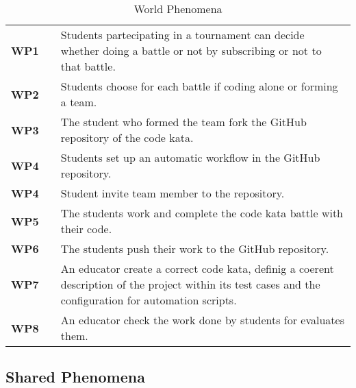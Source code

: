 \begin{table}[H]
    \centering
    \renewcommand{\arraystretch}{1.5}
    \begin{tabular}{l l p{12cm}}
        \hline
        \textbf{WP1} &  & Students partecipating in a tournament can decide whether doing a battle or not by subscribing or not to that battle.                                    \\
        \textbf{WP2} &  & Students choose for each battle if coding alone or forming a team.                                                                                       \\
        \textbf{WP3} &  & The student who formed the team fork the GitHub repository of the code kata.                                                                             \\
        \textbf{WP4} &  & Students set up an automatic workflow in the GitHub repository.                                                                                          \\
        \textbf{WP4} &  & Student invite team member to the repository.                                                                                                            \\
        \textbf{WP5} &  & The students work and complete the code kata battle with their code.                                                                                     \\
        \textbf{WP6} &  & The students push their work to the GitHub repository.                                                                                                   \\
        \textbf{WP7} &  & An educator create a correct code kata, definig a coerent description of the project within its test cases and the configuration for automation scripts. \\
        \textbf{WP8} &  & An educator check the work done by students for evaluates them.                                                                                          \\
        \hline
    \end{tabular}
    \caption{World Phenomena}
\end{table}

\subsection{Shared Phenomena}

